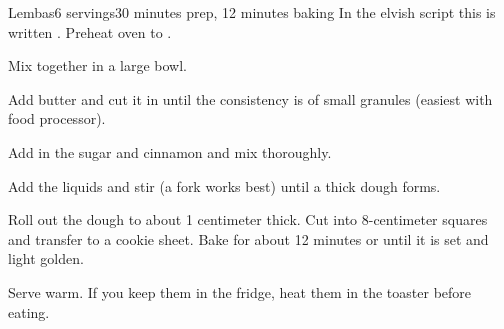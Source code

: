 \documentclass[../Cookbook.tex]{subfiles}
\begin{document}
\begin{recipe}{Lembas}{6 servings}{30 minutes prep, 12 minutes baking}
In the elvish script this is written
\tengwarannatar{\Tlambe \TTacute \Tumbar \TTthreedots \Tsilmenuquerna}.
Preheat oven to .

Mix together in a large bowl.

Add butter and cut it in until the consistency is of small granules (easiest with food processor).

Add in the sugar and cinnamon and mix thoroughly.

Add the liquids and stir (a fork works best) until a thick dough forms.

Roll out the dough to about 1 centimeter thick. Cut into 8-centimeter squares and transfer to a cookie sheet. Bake for about 12 minutes or until it is set and light golden.

Serve warm. If you keep them in the fridge, heat them in the toaster before eating.

\end{recipe}
\end{document}
